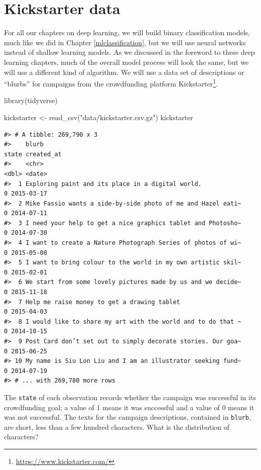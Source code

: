 \documentclass[
]{krantz}
\makeatletter
\newenvironment{Shaded}{\begin{snugshade}}{\end{snugshade}}
\newcommand{\FunctionTok}[1]{\textcolor[rgb]{0.00,0.00,0.00}{#1}}
\newcommand{\NormalTok}[1]{#1}
\newcommand{\OtherTok}[1]{\textcolor[rgb]{0.56,0.35,0.01}{#1}}
\newcommand{\StringTok}[1]{\textcolor[rgb]{0.31,0.60,0.02}{#1}}
\DeclareRobustCommand{\href}[2]{#2\footnote{\url{#1}}}
\renewcommand{\href}[2]{#2\footnote{\url{#1}}}
\newenvironment{kframe}{%
\medskip{}
\setlength{\fboxsep}{.8em}
 \def\at@end@of@kframe{}%
 \ifinner\ifhmode%
  \def\at@end@of@kframe{\end{minipage}}%
  \begin{minipage}{\columnwidth}%
 \fi\fi%
 \def\FrameCommand##1{\hskip\@totalleftmargin \hskip-\fboxsep
 \colorbox{shadecolor}{##1}\hskip-\fboxsep
     \hskip-\linewidth \hskip-\@totalleftmargin \hskip\columnwidth}%
 \MakeFramed {\advance\hsize-\width
   \@totalleftmargin\z@ \linewidth\hsize
   \@setminipage}}%
 {\par\unskip\endMakeFramed%
 \at@end@of@kframe}
\renewenvironment{Shaded}{\begin{kframe}}{\end{kframe}}
\makeatother
\begin{document}
\hypertarget{kickstarter}{%
\section{Kickstarter data}\label{kickstarter}}

For all our chapters on deep learning, we will build binary classification models, much like we did in Chapter \ref{mlclassification}, but we will use neural networks instead of shallow learning models. As we discussed in the foreword to these deep learning chapters, much of the overall model process will look the same, but we will use a different kind of algorithm. We will use a data set of descriptions or ``blurbs'' for campaigns from the crowdfunding platform \href{https://www.kickstarter.com/}{Kickstarter}.

\begin{Shaded}
\begin{Highlighting}[]
\FunctionTok{library}\NormalTok{(tidyverse)}

\NormalTok{kickstarter }\OtherTok{\textless{}{-}} \FunctionTok{read\_csv}\NormalTok{(}\StringTok{"data/kickstarter.csv.gz"}\NormalTok{)}
\NormalTok{kickstarter}
\end{Highlighting}
\end{Shaded}

\begin{verbatim}
#> # A tibble: 269,790 x 3
#>    blurb                                                        state created_at
#>    <chr>                                                        <dbl> <date>    
#>  1 Exploring paint and its place in a digital world.                0 2015-03-17
#>  2 Mike Fassio wants a side-by-side photo of me and Hazel eati~     0 2014-07-11
#>  3 I need your help to get a nice graphics tablet and Photosho~     0 2014-07-30
#>  4 I want to create a Nature Photograph Series of photos of wi~     0 2015-05-08
#>  5 I want to bring colour to the world in my own artistic skil~     0 2015-02-01
#>  6 We start from some lovely pictures made by us and we decide~     0 2015-11-18
#>  7 Help me raise money to get a drawing tablet                      0 2015-04-03
#>  8 I would like to share my art with the world and to do that ~     0 2014-10-15
#>  9 Post Card don’t set out to simply decorate stories. Our goa~     0 2015-06-25
#> 10 My name is Siu Lon Liu and I am an illustrator seeking fund~     0 2014-07-19
#> # ... with 269,780 more rows
\end{verbatim}

The \texttt{state} of each observation records whether the campaign was successful in its crowdfunding goal; a value of 1 means it was successful and a value of 0 means it was not successful. The texts for the campaign descriptions, contained in \texttt{blurb}, are short, less than a few hundred characters. What is the distribution of characters?
\end{document}
